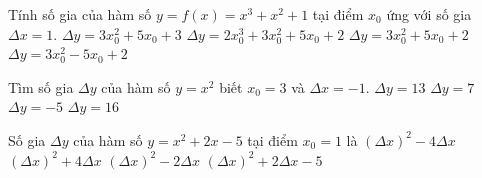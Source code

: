 \begin{ex}%
	Tính số gia của hàm số $y=f(x)=x^3+x^2+1$ tại điểm $x_0$ ứng với  số gia $\Delta x=1$.
	\choice 
		{$\Delta y=3x_0^2+5x_0+3$} 
		{$\Delta y=2x_0^3+3x_0^2+5x_0+2$} 
		{\True $\Delta y=3x_0^2+5x_0+2$} 
		{$\Delta y=3x_0^2-5x_0+2$} 
\end{ex}

\begin{ex}%
	Tìm số gia $ \Delta y $ của hàm số $ y = x^2 $ biết $ x_0 =  3 $ và $ \Delta x = -1 $.
	 \choice
		{$  \Delta y = 13 $}
		 {$ \Delta y = 7 $}
		{\True $ \Delta y  = -5 $}
		{$ \Delta y = 16 $} 
\end{ex}

\begin{ex}%
	Số  gia $\Delta y$ của hàm số $y = x^2 + 2x - 5$ tại điểm $x_0 = 1$ là
	\choice 
		{${\left( {\Delta x} \right)^2} - 4\Delta  x$}
		{\True ${\left( {\Delta x} \right)^2} + 4\Delta  x$}
		{${\left( {\Delta  x} \right)^2} - 2\Delta x$}
		{${\left(  {\Delta x} \right)^2} + 2\Delta x - 5$}
\end{ex}



